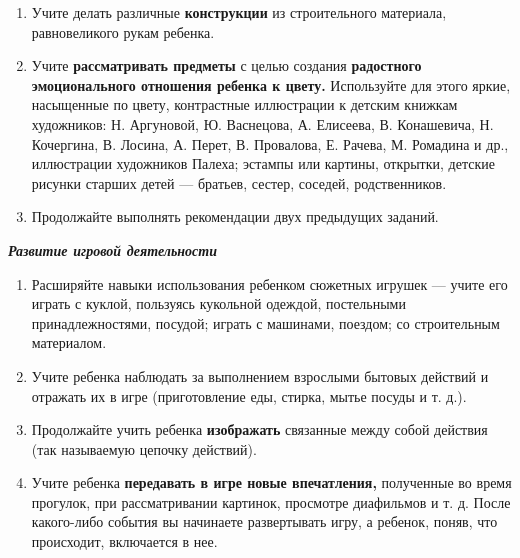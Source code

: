 \documentclass{book}
\renewcommand{\emph}[1]{\textit{#1}}
\begin{document}
\begin{enumerate}
\def\labelenumi{\arabic{enumi}.}
\setcounter{enumi}{1}
\item
  
  Учите делать различные \textbf{конструкции} из строительного
  материала, равновеликого рукам ребенка.
  
\item
  
  Учите \textbf{рассматривать предметы} с целью создания
  \textbf{радостного эмоционального отношения ребенка к цвету.}
  Используйте для этого яркие, насыщенные по цвету, контрастные
  иллюстрации к детским книжкам художников: Н. Аргуновой, Ю. Васнецова,
  А. Елисеева, В. Конашевича, Н. Кочергина, В. Лосина, А. Перет, В.
  Провалова, Е. Рачева, М. Ромадина и др., иллюстрации художников
  Палеха; эстампы или картины, открытки, детские рисунки старших детей
  --- братьев, сестер, соседей, родственников.
  
\item
  
  Продолжайте выполнять рекомендации двух предыдущих заданий.
  
\end{enumerate}


\emph{\textbf{Развитие игровой деятельности}}


\begin{enumerate}
\def\labelenumi{\arabic{enumi}.}
\item
  
  Расширяйте навыки использования ребенком сюжетных игрушек --- учите
  его играть с куклой, пользуясь кукольной одеждой, постельными
  принадлежностями, посудой; играть с машинами, поездом; со строительным
  материалом.
  
\item
  
  Учите ребенка наблюдать за выполнением взрослыми бытовых действий и
  отражать их в игре (приготовление еды, стирка, мытье посуды и т. д.).
  
\item
  
  Продолжайте учить ребенка \textbf{изображать} связанные между собой
  действия (так называемую цепочку действий).
  
\item
  
  Учите ребенка \textbf{передавать в игре новые впечатления,} полученные
  во время прогулок, при рассматривании картинок, просмотре диафильмов и
  т. д. После какого-либо события вы начинаете развертывать игру, а
  ребенок, поняв, что происходит, включается в нее.
  
\end{enumerate}
\end{document}
